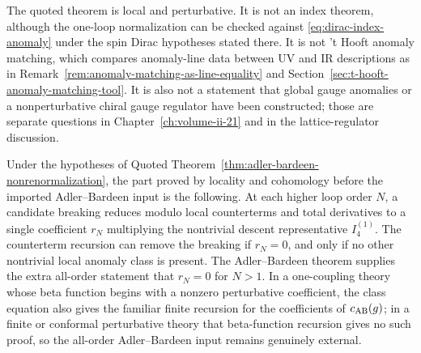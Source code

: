 \begin{quotedtheorem}
The quoted theorem is local and perturbative.  It is not an index theorem, although
the one-loop normalization can be checked against
\eqref{eq:dirac-index-anomaly} under the spin Dirac hypotheses stated there.
It is not 't Hooft anomaly matching, which compares anomaly-line data
between UV and IR descriptions as in
Remark~\ref{rem:anomaly-matching-as-line-equality} and
Section~\ref{sec:t-hooft-anomaly-matching-tool}.  It is also not a statement
that global gauge anomalies or a nonperturbative chiral gauge regulator have
been constructed; those are separate questions in
Chapter~\ref{ch:volume-ii-21} and in the lattice-regulator discussion.
\end{quotedtheorem}

\begin{proposition}
\label{prop:adler-bardeen-local-coefficient-reduction}
Under the hypotheses of
Quoted Theorem~\ref{thm:adler-bardeen-nonrenormalization}, the part proved by
locality and cohomology before the imported Adler--Bardeen input is the
following.  At each higher loop order \(N\), a candidate breaking reduces
modulo local counterterms and total derivatives to a single coefficient
\(r_N\) multiplying the nontrivial descent representative \(I_4^{(1)}\).  The
counterterm recursion can remove the breaking if \(r_N=0\), and only if no
other nontrivial local anomaly class is present.  The Adler--Bardeen theorem
supplies the extra all-order statement that \(r_N=0\) for \(N>1\).  In a
one-coupling theory whose beta function begins with a nonzero perturbative
coefficient, the class equation also gives the familiar finite recursion for
the coefficients of \(c_{\rm AB}(g)\); in a finite or conformal perturbative
theory that beta-function recursion gives no such proof, so the all-order
Adler--Bardeen input remains genuinely external.
\end{proposition}

